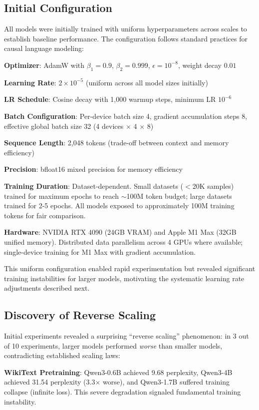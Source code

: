 \subsection{Initial Configuration}

All models were initially trained with uniform hyperparameters across scales to establish baseline performance. The configuration follows standard practices for causal language modeling:

\textbf{Optimizer}: AdamW with $\beta_1=0.9$, $\beta_2=0.999$, $\epsilon=10^{-8}$, weight decay $0.01$

\textbf{Learning Rate}: $2 \times 10^{-5}$ (uniform across all model sizes initially)

\textbf{LR Schedule}: Cosine decay with 1,000 warmup steps, minimum LR $10^{-6}$

\textbf{Batch Configuration}: Per-device batch size 4, gradient accumulation steps 8, effective global batch size 32 (4 devices $\times$ 4 $\times$ 8)

\textbf{Sequence Length}: 2,048 tokens (trade-off between context and memory efficiency)

\textbf{Precision}: bfloat16 mixed precision for memory efficiency

\textbf{Training Duration}: Dataset-dependent. Small datasets ($<$20K samples) trained for maximum epochs to reach $\sim$100M token budget; large datasets trained for 2-5 epochs. All models exposed to approximately 100M training tokens for fair comparison.

\textbf{Hardware}: NVIDIA RTX 4090 (24GB VRAM) and Apple M1 Max (32GB unified memory). Distributed data parallelism across 4 GPUs where available; single-device training for M1 Max with gradient accumulation.

This uniform configuration enabled rapid experimentation but revealed significant training instabilities for larger models, motivating the systematic learning rate adjustments described next.

\subsection{Discovery of Reverse Scaling}

Initial experiments revealed a surprising ``reverse scaling'' phenomenon: in 3 out of 10 experiments, larger models performed \textit{worse} than smaller models, contradicting established scaling laws:

\textbf{WikiText Pretraining}: Qwen3-0.6B achieved 9.68 perplexity, Qwen3-4B achieved 31.54 perplexity (3.3$\times$ worse), and Qwen3-1.7B suffered training collapse (infinite loss). This severe degradation signaled fundamental training instability.

